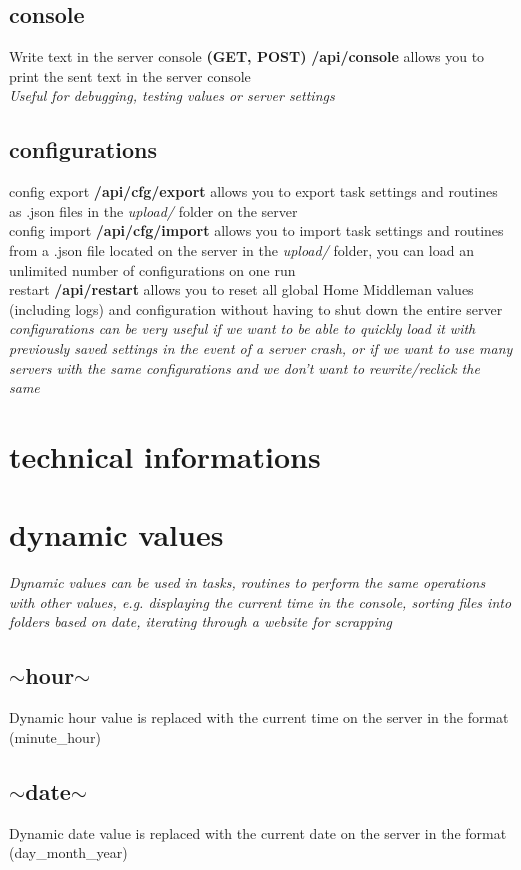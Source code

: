 \documentclass{article}
\begin{document}
\subsection{console}
Write text in the server console \textbf{(GET, POST)} \textbf{/api/console} allows you to print the sent text in the server console\\
\textit{Useful for debugging, testing values or server settings}
\subsection{configurations}
config export \textbf{/api/cfg/export} allows you to export task settings and routines as .json files in the \textit{upload/} folder on the server\\
config import \textbf{/api/cfg/import} allows you to import task settings and routines from a .json file located on the server in the \textit{upload/} folder, you can load an unlimited number of configurations on one run\\
restart \textbf{/api/restart} allows you to reset all global Home Middleman values (including logs) and configuration without having to shut down the entire server\\
\textit{configurations can be very useful if we want to be able to quickly load it with previously saved settings in the event of a server crash, or if we want to use many servers with the same configurations and we don't want to rewrite/reclick the same}
\section{technical informations}
\section{dynamic values}
\textit{Dynamic values can be used in tasks, routines to perform the same operations with other values, e.g. displaying the current time in the console, sorting files into folders based on date, iterating through a website for scrapping}
\subsection{$\sim$hour$\sim$}
Dynamic hour value is replaced with the current time on the server in the format (minute\_hour)
\subsection{$\sim$date$\sim$}
Dynamic date value is replaced with the current date on the server in the format (day\_month\_year)
\end{document}

